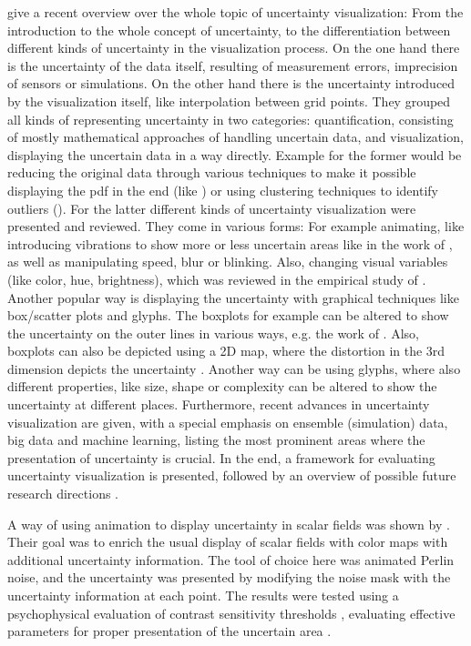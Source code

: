 \citeauthor{kamal_recent_2021} give a recent overview over the whole topic of uncertainty visualization: From the introduction to  the whole concept of uncertainty, to the differentiation between different kinds of uncertainty in the visualization process.
On the one hand there is the uncertainty of the data itself, resulting of measurement errors, imprecision of sensors or simulations. 
On the other hand there is the uncertainty introduced by the visualization itself, like interpolation between grid points.  
They grouped all kinds of representing uncertainty in two categories: quantification, consisting of mostly mathematical approaches of handling uncertain data, and visualization, displaying the uncertain data in a way directly. 
Example for the former would be reducing the original data through various techniques to make it possible displaying the \ac{pdf} in the end (like ) or using clustering techniques to identify outliers (\cite{bordoloi_visualization_2004}). 
For the latter different kinds of uncertainty visualization were presented and reviewed.
They come in various forms: For example animating, like introducing vibrations to show more or less uncertain areas  like in the work of ,  as well as manipulating speed, blur or blinking.  
Also, changing visual variables (like color, hue, brightness), which was reviewed in the empirical study of . 
Another popular way is displaying the uncertainty with graphical techniques like box/scatter plots and glyphs.
The boxplots for example can be altered to show the uncertainty on the outer lines in various ways, e.g. the work of \cite{benjamini_opening_1988}. 
Also, boxplots can also be depicted using a 2D map, where the distortion in the 3rd dimension depicts the uncertainty \cite{kao_visualizing_2002}. 
Another way can be using glyphs, where also different properties, like size, shape or complexity can be altered to show the uncertainty at different places. 
Furthermore, recent advances in uncertainty visualization are given, with a special emphasis on ensemble (simulation) data, big data and machine learning, listing the most prominent areas where the presentation of uncertainty is crucial. 
In the end, a framework for evaluating uncertainty visualization is presented, followed by an overview of possible future research directions \cite{kamal_recent_2021}. 

A way of using animation to display uncertainty in scalar fields was shown by \citeauthor{coninx_visualization_2011}. 
Their goal was to enrich the usual display of scalar fields with color maps with additional uncertainty information. 
The tool of choice here was animated Perlin noise, and the uncertainty was presented by modifying the noise mask with the uncertainty information at each point. 
The results were tested using a psychophysical evaluation of contrast sensitivity thresholds \cite{coninx_visualization_2011}, evaluating effective parameters for proper presentation of the uncertain area \cite{coninx_visualization_2011}.

